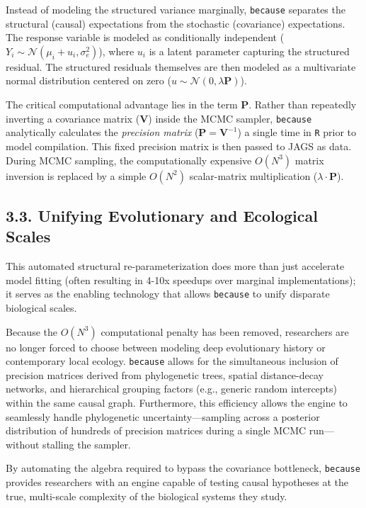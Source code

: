 \documentclass[
]{article}
\begin{document}
Instead of modeling the structured variance marginally, \texttt{because} separates the structural (causal) expectations from the stochastic (covariance) expectations. The response variable is modeled as conditionally independent (\(Y_i \sim \mathcal{N}(\mu_i + u_i, \sigma^2_e)\)), where \(u_i\) is a latent parameter capturing the structured residual. The structured residuals themselves are then modeled as a multivariate normal distribution centered on zero (\(u \sim \mathcal{N}(0, \lambda \mathbf{P})\)).

The critical computational advantage lies in the term \(\mathbf{P}\). Rather than repeatedly inverting a covariance matrix (\(\mathbf{V}\)) inside the MCMC sampler, \texttt{because} analytically calculates the \emph{precision matrix} (\(\mathbf{P} = \mathbf{V}^{-1}\)) a single time in \texttt{R} prior to model compilation. This fixed precision matrix is then passed to JAGS as data. During MCMC sampling, the computationally expensive \(O(N^3)\) matrix inversion is replaced by a simple \(O(N^2)\) scalar-matrix multiplication (\(\lambda \cdot \mathbf{P}\)).

\subsection{3.3. Unifying Evolutionary and Ecological Scales}\label{unifying-evolutionary-and-ecological-scales}

This automated structural re-parameterization does more than just accelerate model fitting (often resulting in 4-10x speedups over marginal implementations); it serves as the enabling technology that allows \texttt{because} to unify disparate biological scales.

Because the \(O(N^3)\) computational penalty has been removed, researchers are no longer forced to choose between modeling deep evolutionary history or contemporary local ecology. \texttt{because} allows for the simultaneous inclusion of precision matrices derived from phylogenetic trees, spatial distance-decay networks, and hierarchical grouping factors (e.g., generic random intercepts) within the same causal graph. Furthermore, this efficiency allows the engine to seamlessly handle phylogenetic uncertainty---sampling across a posterior distribution of hundreds of precision matrices during a single MCMC run---without stalling the sampler.

By automating the algebra required to bypass the covariance bottleneck, \texttt{because} provides researchers with an engine capable of testing causal hypotheses at the true, multi-scale complexity of the biological systems they study.
\end{document}
